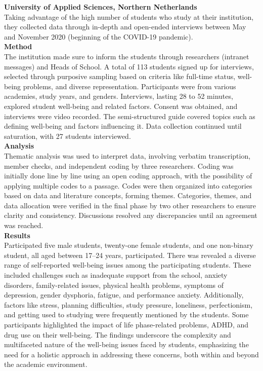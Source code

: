 \documentclass[11pt]{report}
\begin{document}
\textbf{University of Applied Sciences, Northern Netherlands \cite{research-1}}
\\ \normalsize Taking advantage of the high number of students who study at their institution, they collected data through in-depth and open-ended interviews between May and November 2020 (beginning of the COVID-19 pandemic).\vspace{5mm} \\
\textbf{Method} \\
The institution made sure to inform the students through researchers (intranet messages) and Heads of School. A total of 113 students signed up for interviews, selected through purposive sampling based on criteria like full-time status, well-being problems, and diverse representation. Participants were from various academies, study years, and genders. Interviews, lasting 28 to 52 minutes, explored student well-being and related factors. Consent was obtained, and interviews were video recorded. The semi-structured guide covered topics such as defining well-being and factors influencing it. Data collection continued until saturation, with 27 students interviewed.\vspace{5mm} \\
\textbf{Analysis} \\
Thematic analysis was used to interpret data, involving verbatim transcription, member checks, and independent coding by three researchers. Coding was initially done line by line using an open coding approach, with the possibility of applying multiple codes to a passage. Codes were then organized into categories based on data and literature concepts, forming themes. Categories, themes, and data allocation were verified in the final phase by two other researchers to ensure clarity and consistency. Discussions resolved any discrepancies until an agreement was reached.\vspace{5mm} \\
\textbf{Results} \\
Participated five male students, twenty-one female students, and one non-binary student, all aged between 17–24 years, participated. There was revealed a diverse range of self-reported well-being issues among the participating students. These included challenges such as inadequate support from the school, anxiety disorders, family-related issues, physical health problems, symptoms of depression, gender dysphoria, fatigue, and performance anxiety. Additionally, factors like stress, planning difficulties, study pressure, loneliness, perfectionism, and getting used to studying were frequently mentioned by the students. Some participants highlighted the impact of life phase-related problems, ADHD, and drug use on their well-being. The findings underscore the complexity and multifaceted nature of the well-being issues faced by students, emphasizing the need for a holistic approach in addressing these concerns, both within and beyond the academic environment.\vspace{5mm} \\
\end{document}
